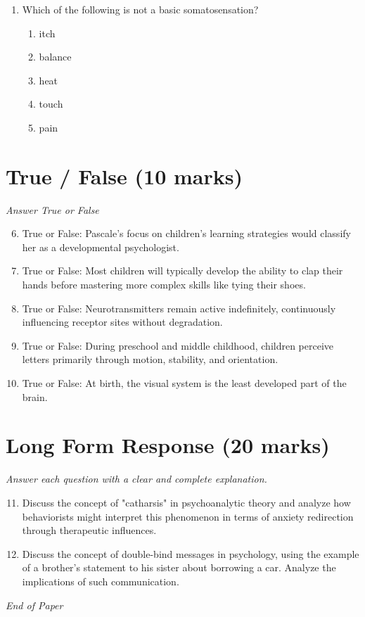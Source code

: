 \documentclass[12pt]{article}
\begin{document}
\begin{enumerate}[label=\arabic*.]
\begin{enumerate}[label=(\alph*)]
    \item more effective for minority clients
    \item only effective for nonminority clients
    \item more effective when client and therapist have different racial/ethnic origins
    \item equally effective
    \item only effective when client and therapist speak the same language
\end{enumerate}
\item Which of the following is not a basic somatosensation?
\begin{enumerate}[label=(\alph*)]
    \item itch
    \item balance
    \item heat
    \item touch
    \item pain
\end{enumerate}
\end{enumerate}

\section*{True / False (10 marks)}
\textit{Answer True or False}
\begin{enumerate}[label=\arabic*.]
\setcounter{enumi}{5}
\item True or False: Pascale's focus on children's learning strategies would classify her as a developmental psychologist.
\item True or False: Most children will typically develop the ability to clap their hands before mastering more complex skills like tying their shoes.
\item True or False: Neurotransmitters remain active indefinitely, continuously influencing receptor sites without degradation.
\item True or False: During preschool and middle childhood, children perceive letters primarily through motion, stability, and orientation.
\item True or False: At birth, the visual system is the least developed part of the brain.
\end{enumerate}

\section*{Long Form Response (20 marks)}
\textit{Answer each question with a clear and complete explanation.}
\begin{enumerate}[label=\arabic*.]
\setcounter{enumi}{10}
\item Discuss the concept of "catharsis" in psychoanalytic theory and analyze how behaviorists might interpret this phenomenon in terms of anxiety redirection through therapeutic influences.
\item Discuss the concept of double-bind messages in psychology, using the example of a brother's statement to his sister about borrowing a car. Analyze the implications of such communication.
\end{enumerate}

\vfill
\noindent\textit{End of Paper}
\end{document}
